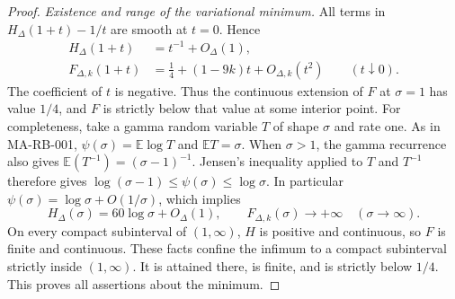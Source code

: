 \begin{proof}
\emph{Existence and range of the variational minimum.}
All terms in \(H_\Delta(1+t)-1/t\) are smooth at
\(t=0\).  Hence
\[
 \begin{aligned}
 H_\Delta(1+t)&=t^{-1}+O_\Delta(1),\\
 F_{\Delta,k}(1+t)
       &=\frac14+(1-9k)t+O_{\Delta,k}(t^2)
                         \qquad(t\downarrow0).
 \end{aligned}
 \tag{MA-RB.79}
\]
The coefficient of \(t\) is negative.  Thus the
continuous extension of \(F\) at \(\sigma=1\) has
value \(1/4\), and \(F\) is strictly below that
value at some interior point.
For completeness, take a gamma random variable \(T\)
of shape \(\sigma\) and rate one.  As in MA-RB-001,
\(\psi(\sigma)=\mathbb E\log T\) and
\(\mathbb ET=\sigma\).  When \(\sigma>1\), the gamma
recurrence also gives \(\mathbb E(T^{-1})=(\sigma-1)^{-1}\).
Jensen's inequality applied to \(T\) and \(T^{-1}\)
therefore gives
\(\log(\sigma-1)\le\psi(\sigma)\le\log\sigma\).
In particular \(\psi(\sigma)=\log\sigma+O(1/\sigma)\),
which implies
\[
 H_\Delta(\sigma)=60\log\sigma+O_\Delta(1),\qquad
 F_{\Delta,k}(\sigma)\longrightarrow+\infty
                       \quad(\sigma\longrightarrow\infty).
 \tag{MA-RB.80}
\]
On every compact subinterval of \((1,\infty)\),
\(H\) is positive and continuous, so \(F\) is finite
and continuous.  These facts confine the infimum to
a compact subinterval strictly inside \((1,\infty)\).
It is attained there, is finite, and is strictly below
\(1/4\).  This proves all assertions about the minimum.
\end{proof}


